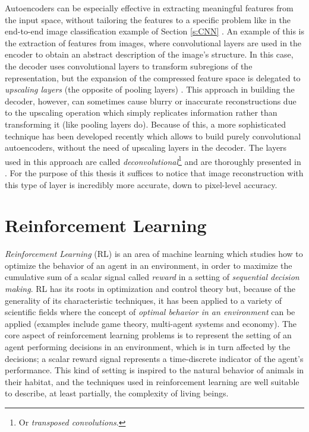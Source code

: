 Autoencoders can be especially effective in extracting meaningful
features from the input space, without tailoring the features to a specific 
problem like in the end-to-end image classification example of Section 
\ref{s:CNN} \cite{erhan2010does}. 
An example of this is the extraction of features from images, 
where convolutional layers are used in the encoder to obtain an abstract 
description of the image's structure. In this case, the decoder uses
convolutional layers to transform subregions of the representation, but the 
expansion of the compressed feature space is delegated to \textit{upscaling 
layers} (the opposite of pooling layers) \cite{masci2011cae}.
This approach in building the decoder, however, can sometimes cause blurry
or inaccurate reconstructions due to the upscaling operation which simply 
replicates information rather than transforming it (like pooling layers do).
Because of this, a more sophisticated technique has been developed recently 
which allows to build purely convolutional autoencoders, without the need of 
upscaling layers in the decoder.
The layers used in this approach are called \textit{deconvolutional}\footnote{Or
\textit{transposed convolutions}.} and are thoroughly presented in 
\cite{zeiler2010deconvolutional}. For the purpose of this thesis it suffices to 
notice that image reconstruction with this type of layer is incredibly more 
accurate, down to pixel-level accuracy.

\section{Reinforcement Learning} \label{s:RL}
\textit{Reinforcement Learning} (RL) is an area of machine learning which
studies how to optimize the behavior of an agent in an environment,
in order to maximize the cumulative sum of a scalar signal called 
\textit{reward} in a setting of \textit{sequential decision making}.
RL has its roots in optimization and control theory but, because of the generality 
of its characteristic techniques, it has been applied to a variety of scientific 
fields where the concept of \textit{optimal behavior in an environment} can be 
applied (examples include game theory, multi-agent systems and economy).
The core aspect of reinforcement learning problems is to represent the setting
of an agent performing decisions in an environment, which is in turn affected by
the decisions; a scalar reward signal represents a time-discrete indicator of 
the agent's performance. This kind of setting is inspired to the natural 
behavior of animals in their habitat, and the techniques used in reinforcement 
learning are well suitable to describe, at least partially, the complexity of
living beings. 

